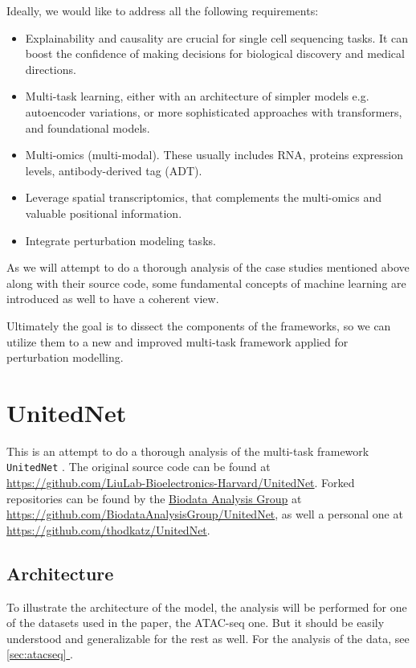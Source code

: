 \documentclass[12pt, a4paper]{article}
\newcommand*{\fullref}[1]{\hyperref[{#1}]{\ref*{#1} \nameref*{#1}}}
\begin{document}
Ideally, we would like to address all the following requirements:
\begin{itemize}
  \itemsep -0.1em
  \item Explainability and causality are crucial for single cell sequencing tasks. It can boost the confidence of making decisions for biological discovery and medical directions.
  \item Multi-task learning, either with an architecture of simpler models e.g. autoencoder variations, or more sophisticated approaches with transformers, and foundational models.
  \item Multi-omics (multi-modal). These usually includes RNA, proteins expression levels, antibody-derived tag (ADT).
  \item Leverage spatial transcriptomics, that complements the multi-omics and valuable positional information.
  \item Integrate perturbation modeling tasks.
\end{itemize}


As we will attempt to do a thorough analysis of the case studies mentioned above along with their source code, some fundamental concepts of machine learning are introduced as well to have a coherent view.

Ultimately the goal is to dissect the components of the frameworks, so we can utilize them to a new and improved multi-task framework applied for perturbation modelling.


\clearpage


\section{UnitedNet}
\label{sec:unitednet}

This is an attempt to do a thorough analysis of the multi-task framework \verb|UnitedNet| \cite{tangExplainableMultitaskLearning2023}. The original source code can be found at \url{https://github.com/LiuLab-Bioelectronics-Harvard/UnitedNet}. Forked repositories can be found by the \href{https://biodataanalysisgroup.github.io/}{Biodata Analysis Group} at \url{https://github.com/BiodataAnalysisGroup/UnitedNet},  as well a personal one at \url{https://github.com/thodkatz/UnitedNet}.


\subsection{Architecture}

To illustrate the architecture of the model, the analysis will be performed for one of the datasets used in the paper, the ATAC-seq one. But it should be easily understood and generalizable for the rest as well. For the analysis of the data, see \fullref{sec:atacseq}.
\end{document}
